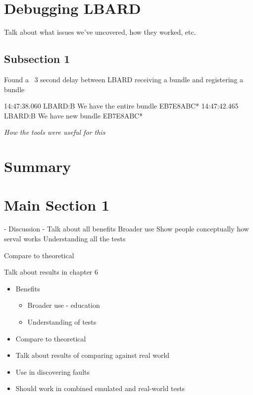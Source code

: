 \section{Debugging LBARD}
Talk about what issues we've uncovered, how they worked, etc.

\subsection{Subsection 1}
Found a ~3 second delay between LBARD receiving a bundle and registering a bundle

14:47:38.060 LBARD:B We have the entire bundle EB7E8ABC*
14:47:42.465 LBARD:B We have new bundle EB7E8ABC*

\emph{How the tools were useful for this}

\section{Summary}


\section{Main Section 1}
- Discussion
- Talk about all benefits
Broader use
Show people conceptually how serval works
Understanding all the tests

Compare to theoretical

Talk about results in chapter 6

\begin{itemize}
    \item Benefits
    \begin{itemize}
        \item Broader use - education
        \item Understanding of tests
    \end{itemize}
    \item Compare to theoretical
    \item Talk about results of comparing against real world
    \item Use in discovering faults
    \item Should work in combined emulated and real-world tests
\end{itemize}


